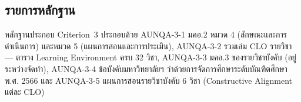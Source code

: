 \subsection*{รายการหลักฐาน}

หลักฐานประกอบ Criterion~3 ประกอบด้วย AUNQA-3-1 มคอ.2 หมวด 4 (ลักษณะและการดำเนินการ) และหมวด 5 (แผนการสอนและการประเมิน), AUNQA-3-2 รวมเล่ม CLO รายวิชา — ตาราง Learning Environment ครบ 32 วิชา, AUNQA-3-3 มคอ.3 ของรายวิชาบังคับ (อยู่ระหว่างจัดทำ), AUNQA-3-4 ข้อบังคับมหาวิทยาลัยฯ ว่าด้วยการจัดการศึกษาระดับบัณฑิตศึกษา พ.ศ. 2566 และ AUNQA-3-5 แผนการสอนรายวิชาบังคับ 6 วิชา (Constructive Alignment แต่ละ CLO)
